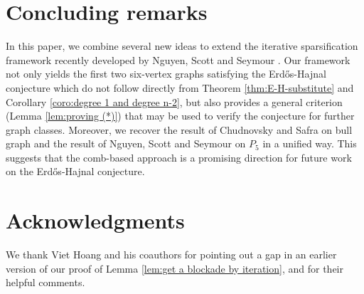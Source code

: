 \documentclass[a4paper,11pt]{article}
\begin{document}
\section{Concluding remarks}

    In this paper, we combine several new ideas to extend the iterative sparsification framework recently developed by Nguyen, Scott and Seymour \cite{NSS23}. Our framework not only yields the first two six-vertex graphs satisfying the Erdős-Hajnal conjecture which do not follow directly from Theorem \ref{thm:E-H-substitute} and Corollary \ref{coro:degree 1 and degree n-2},
    but also provides a general criterion (Lemma \ref{lem:proving (*)}) that may be used to verify the conjecture for further graph classes. Moreover, we recover the result of Chudnovsky and Safra \cite{CS08} on bull graph and the result of Nguyen, Scott and Seymour \cite{NSS23} on $P_5$ in a unified way.  
    This suggests that the comb-based approach is a promising direction for future work on the Erdős-Hajnal conjecture.

\section*{Acknowledgments}
We thank Viet Hoang and his coauthors for pointing out a gap in an earlier version of our proof of Lemma \ref{lem:get a blockade by iteration}, and for their helpful comments.
    
\end{document}
